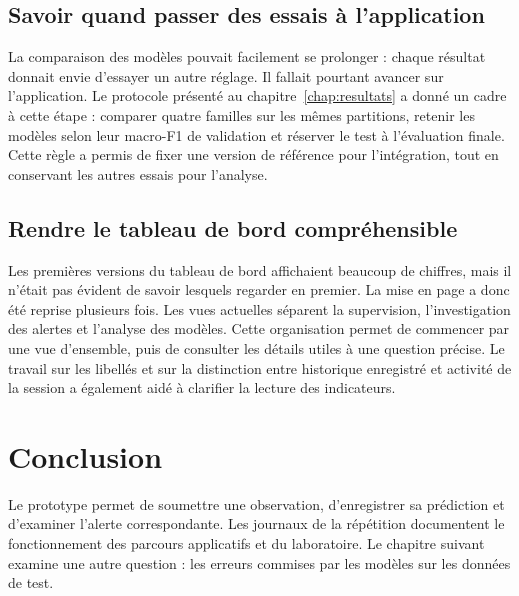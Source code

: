 \subsection{Savoir quand passer des essais à l'application}

La comparaison des modèles pouvait facilement se prolonger : chaque résultat
donnait envie d'essayer un autre réglage. Il fallait pourtant avancer sur
l'application. Le protocole présenté au chapitre~\ref{chap:resultats} a donné
un cadre à cette étape : comparer quatre familles sur les mêmes partitions,
retenir les modèles selon leur macro-F1 de validation et réserver le test à
l'évaluation finale. Cette règle a permis de fixer une version de référence
pour l'intégration, tout en conservant les autres essais pour l'analyse.

\subsection{Rendre le tableau de bord compréhensible}

Les premières versions du tableau de bord affichaient beaucoup de chiffres,
mais il n'était pas évident de savoir lesquels regarder en premier. La mise en
page a donc été reprise plusieurs fois. Les vues actuelles séparent la
supervision, l'investigation des alertes et l'analyse des modèles. Cette
organisation permet de commencer par une vue d'ensemble, puis de consulter les
détails utiles à une question précise. Le travail sur les libellés et sur la
distinction entre historique enregistré et activité de la session a également
aidé à clarifier la lecture des indicateurs.

\section{Conclusion}

Le prototype permet de soumettre une observation, d'enregistrer sa prédiction
et d'examiner l'alerte correspondante. Les journaux de la répétition documentent
le fonctionnement des parcours applicatifs et du laboratoire. Le chapitre
suivant examine une autre question : les erreurs commises par les modèles sur
les données de test.
